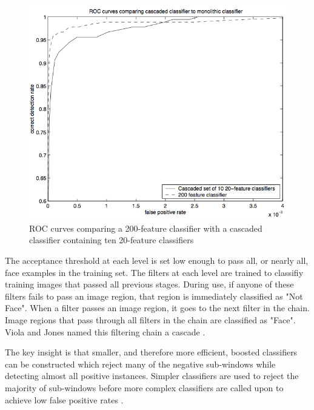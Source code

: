 \begin{figure}[!h]
\begin{center}
\noindent \includegraphics[scale=0.6]{figures/haar_feature_cascade_example_result} 
\newline
\caption{ROC curves comparing a 200-feature classifier with a cascaded classifier containing ten 20-feature classifiers}
\label{haar_feature_cascade_example_result}
\end{center} 
\end{figure}

\noindent The acceptance threshold at each level is set low enough to pass all, or nearly all, face examples in the training set. The filters at each level are trained to classifiy training images that passed all previous stages. During use, if anyone of these filters fails to pass an image region, that region is immediately classified as "Not Face". When a filter passes an image region, it goes to the next filter in the chain. Image regions that pass through all filters in the chain are classified as "Face". Viola and Jones named this filtering chain a cascade \cite{HEW07}.
\newline

\noindent The key insight is that smaller, and therefore more efficient, boosted classifiers can be constructed which reject many of the negative sub-windows while detecting almost all positive instances. Simpler classifiers are used to reject the majority of sub-windows before more complex classifiers are called upon to achieve low false positive rates \cite{VIO01}.
\newline

